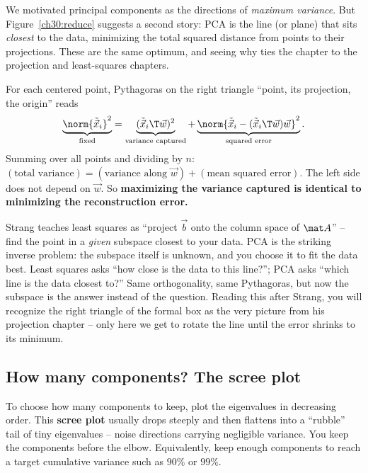 We motivated principal components as the directions of \emph{maximum variance}. But
Figure~\ref{ch30:reduce} suggests a second story: PCA is the line (or plane) that
sits \emph{closest} to the data, minimizing the total squared distance from points
to their projections. These are the same optimum, and seeing why ties the chapter
to the projection and least-squares chapters.

\begin{formalbox}
For each centered point, Pythagoras on the right triangle ``point, its projection,
the origin'' reads
\[
  \underbrace{\norm{\tilde{\vec x}_i}^2}_{\text{fixed}}
  =\underbrace{(\tilde{\vec x}_i\T\vec w)^2}_{\text{variance captured}}
  +\underbrace{\norm{\tilde{\vec x}_i-(\tilde{\vec x}_i\T\vec w)\vec w}^2}_{\text{squared error}} .
\]
Summing over all points and dividing by $n$: $(\text{total variance})=(\text{variance
along }\vec w)+(\text{mean squared error})$. The left side does not depend on
$\vec w$. So \textbf{maximizing the variance captured is identical to minimizing the
reconstruction error.}
\end{formalbox}

\begin{strangbox}
Strang teaches least squares as ``project $\vec b$ onto the column space of $\mat
A$'' -- find the point in a \emph{given} subspace closest to your data. PCA is the
striking inverse problem: the subspace itself is unknown, and you choose it to fit
the data best. Least squares asks ``how close is the data to this line?''; PCA asks
``which line is the data closest to?'' Same orthogonality, same Pythagoras, but now
the subspace is the answer instead of the question. Reading this after Strang, you
will recognize the right triangle of the formal box as the very picture from his
projection chapter -- only here we get to rotate the line until the error shrinks to
its minimum.
\end{strangbox}

\subsection{How many components? The scree plot}

To choose how many components to keep, plot the eigenvalues in decreasing order.
This \textbf{scree plot} usually drops steeply and then flattens into a ``rubble''
tail of tiny eigenvalues -- noise directions carrying negligible variance. You keep
the components before the elbow. Equivalently, keep enough components to reach a
target cumulative variance such as $90\%$ or $99\%$.


